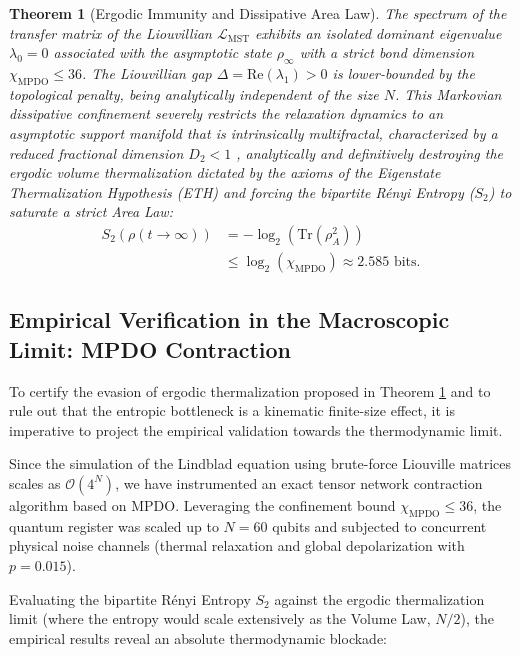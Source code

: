 \documentclass[reprint,aps,pra,superscriptaddress,nofootinbib]{revtex4-2}
\theoremstyle{plain}
\newtheorem{theorem}{Theorem}[section]
\theoremstyle{definition}
\theoremstyle{remark}
\begin{document}
\begin{theorem}[Ergodic Immunity and Dissipative Area Law]
\label{teo:parent_lindbladian}
The spectrum of the transfer matrix of the Liouvillian $\mathcal{L}_{\text{MST}}$ exhibits an isolated dominant eigenvalue $\lambda_0 = 0$ associated with the asymptotic state $\rho_\infty$ with a strict bond dimension $\chi_{\text{MPDO}} \le 36$. The Liouvillian gap $\Delta = \text{Re}(\lambda_1) > 0$ is lower-bounded by the topological penalty, being analytically independent of the size $N$. This Markovian dissipative confinement severely restricts the relaxation dynamics to an asymptotic support manifold that is intrinsically multifractal, characterized by a reduced fractional dimension $D_2 < 1$ \cite{Peinador_Modular_Quantum_Chaos_2026}, analytically and definitively destroying the ergodic volume thermalization dictated by the axioms of the Eigenstate Thermalization Hypothesis (ETH) and forcing the bipartite Rényi Entropy ($S_2$) to saturate a strict Area Law:
\begin{equation}
\begin{split}
S_2(\rho(t \to \infty)) &= -\log_2(\text{Tr}(\rho_A^2)) \\
&\le \log_2(\chi_{\text{MPDO}}) \approx 2.585 \text{ bits}.
\end{split}
\end{equation}
\end{theorem}

\subsection{Empirical Verification in the Macroscopic Limit: MPDO Contraction}
\label{subsec:verificacion_empirica}

To certify the evasion of ergodic thermalization proposed in Theorem \ref{teo:parent_lindbladian} and to rule out that the entropic bottleneck is a kinematic finite-size effect, it is imperative to project the empirical validation towards the thermodynamic limit. 

Since the simulation of the Lindblad equation using brute-force Liouville matrices scales as $\mathcal{O}(4^N)$, we have instrumented an exact tensor network contraction algorithm based on MPDO. Leveraging the confinement bound $\chi_{\text{MPDO}} \le 36$, the quantum register was scaled up to $N=60$ qubits and subjected to concurrent physical noise channels (thermal relaxation and global depolarization with $p=0.015$).

Evaluating the bipartite Rényi Entropy $S_2$ against the ergodic thermalization limit (where the entropy would scale extensively as the Volume Law, $N/2$), the empirical results reveal an absolute thermodynamic blockade:
\end{document}
